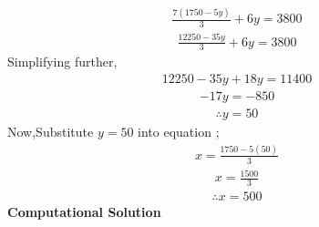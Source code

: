 \documentclass[journal]{IEEEtran}
\begin{document}
\begin{align}
        \frac{7(1750 - 5y)}{3} + 6y= 3800 
\end{align}
\begin{align}
        \frac{12250 - 35y}{3} + 6y = 3800
\end{align}
Simplifying further,
\begin{align}
    12250 - 35y + 18y = 11400 
\end{align}
\begin{align}
    -17y = -850    
\end{align}
\begin{align}
       \therefore y = 50
\end{align}
Now,Substitute \(y = 50\) into equation ;
\begin{align}
    x = \frac{1750 - 5(50)}{3} 
\end{align}
\begin{align}
        x = \frac{1500}{3} 
\end{align}
\begin{align}
    \therefore x = 500
\end{align}
\textbf{Computational Solution}
\end{document}
